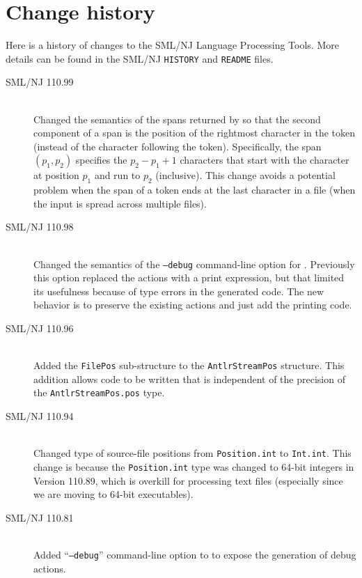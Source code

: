 %
\chapter{Change history}
\label{ch:history}

Here is a history of changes to the SML/NJ Language Processing Tools.
More details can be found in the SML/NJ \texttt{HISTORY} and \texttt{README} files.
\begin{description}
  \item[SML/NJ 110.99]
    \mbox{}\\[0.5em]
    Changed the semantics of the spans returned by \ulex{} so that the second
    component of a span is the position of the rightmost character in the token (instead
    of the character following the token).
    Specifically, the span $(p_1, p_2)$ specifies the $p_2 - p_1 + 1$ characters
    that start with the character at position $p_1$ and run to $p_2$ (inclusive).
    This change avoids a potential problem when the span of a token ends at the last
    character in a file (when the input is spread across multiple files).
  \item[SML/NJ 110.98]
    \mbox{}\\[0.5em]
    Changed the semantics of the \texttt{--debug} command-line option for \mlantlr{}.
    Previously this option replaced the actions with a print expression, but that
    limited its usefulness because of type errors in the generated code.  The new
    behavior is to preserve the existing actions and just add the printing code.
  \item[SML/NJ 110.96]
    \mbox{}\\[0.5em]
    Added the \texttt{FilePos} sub-structure to the \texttt{AntlrStreamPos} structure.
    This addition allows code to be written that is independent of the precision
    of the \texttt{AntlrStreamPos.pos} type.
  \item[SML/NJ 110.94]
    \mbox{}\\[0.5em]
    Changed type of source-file positions from \texttt{Position.int} to \texttt{Int.int}.
    This change is because the \texttt{Position.int} type was changed to 64-bit integers
    in Version 110.89, which is overkill for processing text files (especially since
    we are moving to 64-bit executables).
  \item[SML/NJ 110.81]
    \mbox{}\\[0.5em]
    Added ``\texttt{--debug}'' command-line option to \mlantlr{} to expose the generation
    of debug actions.
    \\[0.5em]

\end{description}
